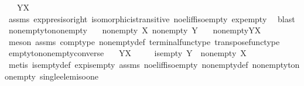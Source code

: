 \begin{isabellebody}
\ \ \ {\isachardoublequoteopen}Y\isactrlbsup X\isactrlesup \ {\isasymcong}\ {\isasymone}{\isachardoublequoteclose}\isanewline
%
\isadelimproof
\ \ %
\endisadelimproof
%
\isatagproof
{}\isamarkupfalse%
\ assms\ exp{\isacharunderscore}{\kern0pt}pres{\isacharunderscore}{\kern0pt}iso{\isacharunderscore}{\kern0pt}right\ isomorphic{\isacharunderscore}{\kern0pt}is{\isacharunderscore}{\kern0pt}transitive\ no{\isacharunderscore}{\kern0pt}el{\isacharunderscore}{\kern0pt}iff{\isacharunderscore}{\kern0pt}iso{\isacharunderscore}{\kern0pt}empty\ exp{\isacharunderscore}{\kern0pt}empty\ \isamarkupfalse%
\ blast%
\endisatagproof
{\isafoldproof}%
%
\isadelimproof
\isanewline
%
\endisadelimproof
\isanewline
{}\isamarkupfalse%
\ nonempty{\isacharunderscore}{\kern0pt}to{\isacharunderscore}{\kern0pt}nonempty{\isacharcolon}{\kern0pt}\isanewline
\ \ \ {\isachardoublequoteopen}nonempty\ X{\isachardoublequoteclose}\ {\isachardoublequoteopen}nonempty\ Y{\isachardoublequoteclose}\isanewline
\ \ \ {\isachardoublequoteopen}nonempty{\isacharparenleft}{\kern0pt}Y\isactrlbsup X\isactrlesup {\isacharparenright}{\kern0pt}{\isachardoublequoteclose}\isanewline
%
\isadelimproof
\ \ %
\endisadelimproof
%
\isatagproof
{}\isamarkupfalse%
\ {\isacharparenleft}{\kern0pt}meson\ assms{\isacharparenleft}{\kern0pt}{}{\isacharparenright}{\kern0pt}\ comp{\isacharunderscore}{\kern0pt}type\ nonempty{\isacharunderscore}{\kern0pt}def\ terminal{\isacharunderscore}{\kern0pt}func{\isacharunderscore}{\kern0pt}type\ transpose{\isacharunderscore}{\kern0pt}func{\isacharunderscore}{\kern0pt}type{\isacharparenright}{\kern0pt}%
\endisatagproof
{\isafoldproof}%
%
\isadelimproof
\isanewline
%
\endisadelimproof
\isanewline
{}\isamarkupfalse%
\ empty{\isacharunderscore}{\kern0pt}to{\isacharunderscore}{\kern0pt}nonempty{\isacharunderscore}{\kern0pt}converse{\isacharcolon}{\kern0pt}\isanewline
\ \ \ {\isachardoublequoteopen}Y\isactrlbsup X\isactrlesup \ {\isasymcong}\ {\isasymemptyset}{\isachardoublequoteclose}\isanewline
\ \ \ {\isachardoublequoteopen}is{\isacharunderscore}{\kern0pt}empty\ Y\ {\isasymand}\ nonempty\ X{\isachardoublequoteclose}\isanewline
%
\isadelimproof
\ \ %
\endisadelimproof
%
\isatagproof
{}\isamarkupfalse%
\ {\isacharparenleft}{\kern0pt}metis\ is{\isacharunderscore}{\kern0pt}empty{\isacharunderscore}{\kern0pt}def\ exp{\isacharunderscore}{\kern0pt}is{\isacharunderscore}{\kern0pt}empty\ assms\ no{\isacharunderscore}{\kern0pt}el{\isacharunderscore}{\kern0pt}iff{\isacharunderscore}{\kern0pt}iso{\isacharunderscore}{\kern0pt}empty\ nonempty{\isacharunderscore}{\kern0pt}def\ nonempty{\isacharunderscore}{\kern0pt}to{\isacharunderscore}{\kern0pt}nonempty\ single{\isacharunderscore}{\kern0pt}elem{\isacharunderscore}{\kern0pt}iso{\isacharunderscore}{\kern0pt}one{\isacharparenright}{\kern0pt}%

\end{isabellebody}
